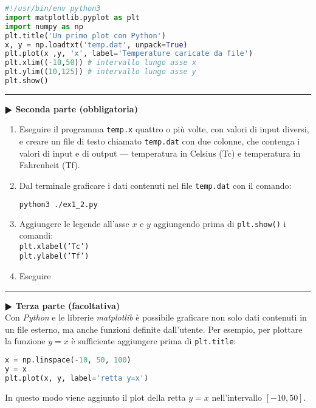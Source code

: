 \documentclass[11pt]{article}
\begin{document}
\newpage
\begin{lstlisting}[caption={Programma {\it python} \texttt{ex1\_2.py}},language=Python]
#!/usr/bin/env python3
import matplotlib.pyplot as plt
import numpy as np
plt.title('Un primo plot con Python')
x, y = np.loadtxt('temp.dat', unpack=True)
plt.plot(x ,y, 'x', label='Temperature caricate da file')
plt.xlim((-10,50)) # intervallo lungo asse x
plt.ylim((10,125)) # intervallo lungo asse y
plt.show()
\end{lstlisting}
\vspace{2mm}
\hrule
\vspace{2mm}
\textbf{$\RHD$ Seconda parte (obbligatoria)} 
%
\begin{enumerate}
\item Eseguire il programma \texttt{temp.x} quattro o pi\`u volte, con valori di input diversi, e creare un file di testo chiamato \texttt{temp.dat} con due colonne,
  che contenga i valori di input e di output --- temperatura in Celsius (Tc) e
  temperatura in Fahrenheit (Tf).
\item Dal terminale graficare i dati contenuti nel file \texttt{temp.dat} con il comando:\\
  \begin{lstlisting}[language=bash,numbers=none]
    python3 ./ex1_2.py
\end{lstlisting}
\item Aggiungere le legende all'asse $x$ e $y$ aggiungendo prima di \texttt{plt.show()} i comandi:
\\
\texttt{plt.xlabel('Tc')}
\\
\texttt{plt.ylabel('Tf')}
 \item Eseguire 
 \end{enumerate}


\hrule
\vspace{2mm}\textbf{$\RHD$ Terza parte (facoltativa)\\}
%
Con {\it Python\/} e le librerie {\it matplotlib\/} \`e possibile graficare non solo dati contenuti in un file esterno, ma anche funzioni definite dall'utente. Per esempio, 
per plottare la funzione $y=x$ \`e sufficiente aggiungere prima di \texttt{plt.title}: 
\begin{lstlisting}[language=python]
x = np.linspace(-10, 50, 100)
y = x
plt.plot(x, y, label='retta y=x')
\end{lstlisting}
In questo modo viene aggiunto il plot della retta $y=x$ nell'intervallo $[-10,50]$. 
\end{document}
